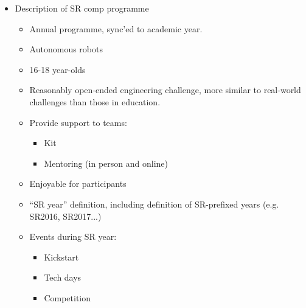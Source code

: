 \begin{itemize}
\item Description of SR comp programme
  \begin{itemize}
  \item Annual programme, sync'ed to academic year.
  \item Autonomous robots
  \item 16-18 year-olds
  \item Reasonably open-ended engineering challenge, more similar to real-world challenges than those in education.
  \item Provide support to teams:
    \begin{itemize}
    \item Kit
    \item Mentoring (in person and online)
    \end{itemize}
  \item Enjoyable for participants

  \item ``SR year'' definition, including definition of SR-prefixed years (e.g. SR2016, SR2017...)

  \item Events during SR year:
    \begin{itemize}
    \item Kickstart
    \item Tech days
    \item Competition
    \end{itemize}
  \end{itemize}
\end{itemize}
